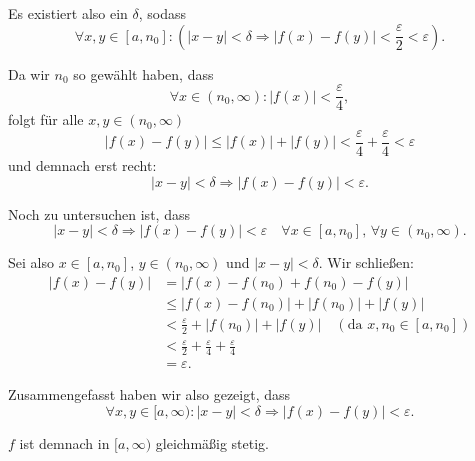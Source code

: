 \documentclass[a4paper,12pt]{article}
\begin{document}
\begin{enumerate}[label=\alph*)]
          Es existiert also ein $\delta$, sodass
          \[
              \forall x, y \in [a, n_0] : (|x - y| < \delta \Rightarrow |f(x) - f(y)| < \frac{\varepsilon}{2} < \varepsilon).
          \]

          Da wir $n_0$ so gewählt haben, dass
          \[
              \forall x \in (n_0, \infty) : |f(x)| < \frac{\varepsilon}{4},
          \]
          folgt für alle $x, y \in (n_0, \infty)$
          \[
              |f(x) - f(y)| \leq |f(x)| + |f(y)| < \frac{\varepsilon}{4} + \frac{\varepsilon}{4} < \varepsilon
          \]
          und demnach erst recht:
          \[
              |x - y| < \delta \Rightarrow |f(x) - f(y)| < \varepsilon.
          \]

          Noch zu untersuchen ist, dass
          \[
              |x - y| < \delta \Rightarrow |f(x) - f(y)| < \varepsilon \quad \forall x \in [a, n_0], \, \forall y \in (n_0, \infty).
          \]

          Sei also $x \in [a, n_0]$, $y \in (n_0, \infty)$ und $|x - y| < \delta$. Wir schließen:
          \begin{align*}
              |f(x) - f(y)| &= |f(x) - f(n_0) + f(n_0) - f(y)| \\
              &\leq |f(x) - f(n_0)| + |f(n_0)| + |f(y)| \\
              &< \frac{\varepsilon}{2} + |f(n_0)| + |f(y)| \quad (\text{da } x, n_0 \in [a, n_0]) \\
              &< \frac{\varepsilon}{2} + \frac{\varepsilon}{4} + \frac{\varepsilon}{4} \\
              &= \varepsilon.
          \end{align*}

          Zusammengefasst haben wir also gezeigt, dass
          \[
              \forall x, y \in [a, \infty) : |x - y| < \delta \Rightarrow |f(x) - f(y)| < \varepsilon.
          \]

          $f$ ist demnach in $[a, \infty)$ gleichmäßig stetig.

\end{enumerate}
\end{document}
